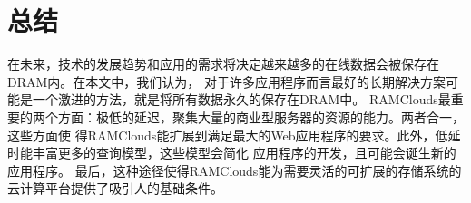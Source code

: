 \documentclass[translation]{zjutreport}
\begin{document}
\chapter{总结}
在未来，技术的发展趋势和应用的需求将决定越来越多的在线数据会被保存在DRAM内。在本文中，我们认为，
对于许多应用程序而言最好的长期​​解决方案可能是一个激进的方法，就是将所有数据永久的保存在DRAM中。
RAMClouds最重要的两个方面：极低的延迟，聚集大量的商业型服务器的资源的能力。两者合一，这些方面使
得RAMClouds能扩展到满足最大的Web应用程序的要求。此外，低延时能丰富更多的查询模型，这些模型会简化
应用程序的开发，且可能会诞生新的应用程序。
最后，这种途径使得RAMClouds能为需要灵活的可扩展的存储系统的
云计算平台提供了吸引人的基础条件。

\backmatter %
\endgroup %

\clearpage %
%
\nocite{*}                                   %


\end{document}
